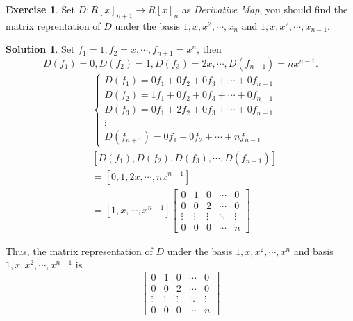 \documentclass{article}
\theoremstyle{definition}
\newtheorem{exe}{Exercise}[section]
\newtheorem{sol}{Solution}[exe]
\begin{document}
\begin{exe}
    Set $D:R[x]_{n+1}\rightarrow R[x]_{n}$ as \textit{Derivative Map}, you 
    should find the matrix reprentation of $D$ under the basis 
    $1,x,x^{2},\cdots,x_{n}$ and $1,x,x^{2},\cdots,x_{n-1}$.
\end{exe}
\begin{sol}
    Set $f_{1}=1,f_{2}=x,\cdots,f_{n+1}=x^{n}$,
    then $$D(f_{1})=0,D(f_{2})=1,D(f_{3})=2x,\cdots,D(f_{n+1})=nx^{n-1}.$$
    \begin{align*}
        &\begin{cases}
            D(f_{1})=0f_{1}+0f_{2}+0f_{3}+\cdots+0f_{n-1}\\
            D(f_{2})=1f_{1}+0f_{2}+0f_{3}+\cdots+0f_{n-1}\\
            D(f_{3})=0f_{1}+2f_{2}+0f_{3}+\cdots+0f_{n-1}\\
            \vdots\\
            D(f_{n+1})=0f_{1}+0f_{2}+\cdots+nf_{n-1}
        \end{cases}\\
        & [D(f_{1}),D(f_{2}),D(f_{3}),\cdots,D(f_{n+1})] \\
        & = [0,1,2x,\cdots,nx^{n-1}] \\ 
        & = [1,x,\cdots,x^{n-1}]
        \begin{bmatrix}
            0 & 1 & 0 & \cdots & 0\\
            0 & 0 & 2 & \cdots & 0\\
            \vdots & \vdots & \vdots & \ddots & \vdots\\
            0 & 0 & 0 & \cdots & n
        \end{bmatrix}
    \end{align*}

    Thus, the matrix representation of $D$ under the basis $1,x,x^{2},\cdots,x^{n}$ 
    and basis $1,x,x^{2},\cdots,x^{n-1}$ is
    $$
    \begin{bmatrix}
        0 & 1 & 0 & \cdots & 0\\
        0 & 0 & 2 & \cdots & 0\\
        \vdots & \vdots & \vdots & \ddots & \vdots\\
        0 & 0 & 0 & \cdots & n
    \end{bmatrix}
    $$
\end{sol}
\end{document}
